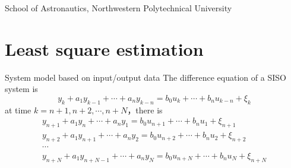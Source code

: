 \DeclareMathOperator*{\argmin}{arg\,min}

\newcommand{\vect}[1]{\boldsymbol{#1}}

\def\lecturename{System Identification}

\title{\insertlecture}

\author{Xing Chao}

\institute
{
   School of Astronautics, Northwestern Polytechnical University
 
}


\subtitle{For white noise}
\date{2017}



\begin{frame}
  \maketitle
\end{frame}

\section{Least square estimation}

\begin{frame}{System model based on input/output data}
 The difference equation of a SISO system is
$$
y_k+a_1 y_{k-1}+\cdots + a_n y_{k-n}=b_0 u_k+\cdots + b_n u_{k-n}+\xi_k
$$
at time $k=n+1,n+2,\cdots,n+N$，there is
\begin{gather*}
y_{n+1}+a_1 y_n+\cdots + a_n y_1 = b_0 u_{n+1}+\cdots + b_n u_1+\xi_{n+1}  \\
y_{n+2}+a_1 y_{n+1}+\cdots + a_n y_2 = b_0 u_{n+2}+\cdots + b_n u_{2}+\xi_{n+2}  \\
\cdots    \\
y_{n+N}+a_1 y_{n+N-1}+\cdots + a_n y_{N} = b_0 u_{n+N}+\cdots + b_n u_{N}+\xi_{n+N}
\end{gather*}
\end{frame}

